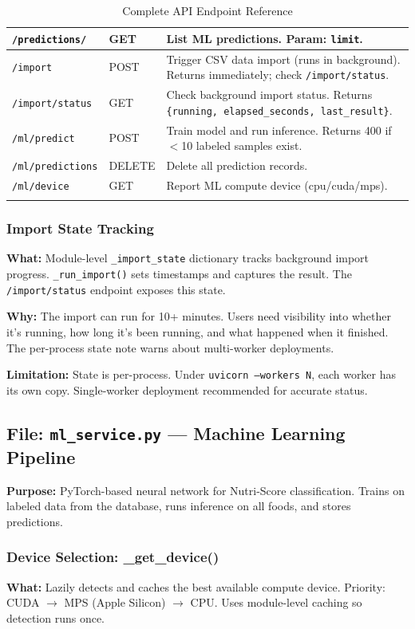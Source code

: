 \documentclass[12pt,a4paper]{article}
\begin{document}
\begin{longtable}{p{4cm}p{3cm}p{8.5cm}}
\midrule
\lstinline|/predictions/| & GET & List ML predictions. Param: \texttt{limit}.\\
\midrule
\lstinline|/import| & POST & Trigger CSV data import (runs in background). Returns immediately; check \texttt{/import/status}.\\
\midrule
\lstinline|/import/status| & GET & Check background import status. Returns \texttt{\{running, elapsed\_seconds, last\_result\}}.\\
\midrule
\lstinline|/ml/predict| & POST & Train model and run inference. Returns 400 if $<$10 labeled samples exist.\\
\midrule
\lstinline|/ml/predictions| & DELETE & Delete all prediction records.\\
\midrule
\lstinline|/ml/device| & GET & Report ML compute device (cpu/cuda/mps).\\
\bottomrule
\caption{Complete API Endpoint Reference}
\end{longtable}

\subsubsection{Import State Tracking}
\textbf{What:} Module-level \texttt{\_import\_state} dictionary tracks background import progress. \texttt{\_run\_import()} sets timestamps and captures the result. The \texttt{/import/status} endpoint exposes this state.

\textbf{Why:} The import can run for 10+ minutes. Users need visibility into whether it's running, how long it's been running, and what happened when it finished. The per-process state note warns about multi-worker deployments.

\textbf{Limitation:} State is per-process. Under \texttt{uvicorn --workers N}, each worker has its own copy. Single-worker deployment recommended for accurate status.

\subsection{File: \texttt{ml\_service.py} — Machine Learning Pipeline}

\textbf{Purpose:} PyTorch-based neural network for Nutri-Score classification. Trains on labeled data from the database, runs inference on all foods, and stores predictions.

\subsubsection{Device Selection: \_get\_device()}
\textbf{What:} Lazily detects and caches the best available compute device. Priority: CUDA $\rightarrow$ MPS (Apple Silicon) $\rightarrow$ CPU. Uses module-level caching so detection runs once.
\end{document}
